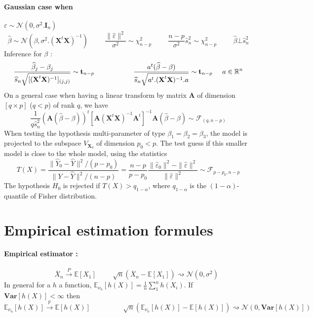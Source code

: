 \documentclass[a4paper,10pt]{article}
\begin{document}
\paragraph{Gaussian case when } $\varepsilon \sim \mathcal{N}(0,\sigma^2.\textbf{I}_n)$
\[
\widehat{\beta} \sim \mathcal{N}(\beta,\sigma^2.(\textbf{X}^t \textbf{X})^{-1}) 
\hspace{1cm}
 \frac{\|\widehat{\varepsilon}\|^2}{\sigma^2} \sim \chi^2_{n-p}  
\hspace{1cm}
\frac{n-p}{\sigma^2} \widehat{s}^2_n \sim \chi^2_{n-p}  
\hspace{1cm} 
\widehat{\beta} \bot \widehat{s}^2_n 
\]
Inference for $\beta$ :
\[
\frac{\widehat{\beta}_j -\beta_j}{\widehat{s}_n \sqrt{[(\textbf{X}^t \textbf{X})^{-1}]_{(j,j)}}} \sim \textbf{t}_{n-p}
\hspace{2cm}
\frac{a^t(\widehat{\beta} -\beta)}{\widehat{s}_n \sqrt{a^t.(\textbf{X}^t \textbf{X})^{-1}.a}} \sim \textbf{t}_{n-p}
\hspace{5mm}
a \in \mathbb{R}^n
\]
On a general case when having a linear transform by matrix $\textbf{A}$ of dimension $[q\times p]$ ($q<p$) of rank $q$, we have
\[
\frac{1}{q\widehat{s}^2_n}
(\textbf{A}(\widehat{\beta} -\beta))^t 
[\textbf{A}  (\textbf{X}^t \textbf{X})^{-1} \textbf{A}^t]^{-1}
\textbf{A}(\widehat{\beta} -\beta)
\sim \mathcal{F}_{(q,n-p)}
\]
When testing the hypothesis multi-parameter of type $\beta_1 = \beta_2 = \beta_3$, the model is projected to the subspace $V_{\textbf{X}_0}$
of dimension $p_0<p$. The test guess if this smaller model is close to the whole model, using the statistics 
\[
T(X) = \frac{\| \widehat{Y}_0 -\widehat{Y} \|^2 / ( p-p_0 )}{\| Y -\widehat{Y} \|^2 / ( n-p )}  = 
\frac{n-p}{p-p_0}\frac{\| \widehat{\varepsilon}_0 \|^2 - \| \widehat{\varepsilon} \|^2 }{ \| \widehat{\varepsilon} \|^2} \sim
\mathcal{F}_{p-p_0,n-p}
\]
The hypothesis $H_0$ is rejected if $T(X) > q_{1-\alpha}$, where $q_{1-\alpha}$ is the $(1-\alpha)$-quantile of Fisher distribution. 

\section{Empirical estimation formules}
\paragraph{Empirical estimator : }
\[
\hspace{1cm} \overline{X}_n\xrightarrow{P} \mathbb{E}[X_{1}] \hspace{1cm} \sqrt{n}(\overline{X}_n -\mathbb{E}[X_{1}]) \rightsquigarrow   \mathcal{N}(0,\sigma^2) 
\]
In general for a $h$ a function, $\mathbb{E}_{\nu_n}[h(X)] = \frac{1}{n}\sum^n_1 h(X_i) $. If $\textbf{Var}[h(X)]<\infty$ then 
\[
\mathbb{E}_{\nu_n}[h(X)] \xrightarrow{ \mathbb{P} } \mathbb{E}[h(X)]
\hspace{2cm}
\sqrt{n}(\mathbb{E}_{\nu_n}[h(X)]  -   \mathbb{E}[h(X)]) \rightsquigarrow   \mathcal{N}(0, \textbf{Var}[h(X)] )
\]
\end{document}
